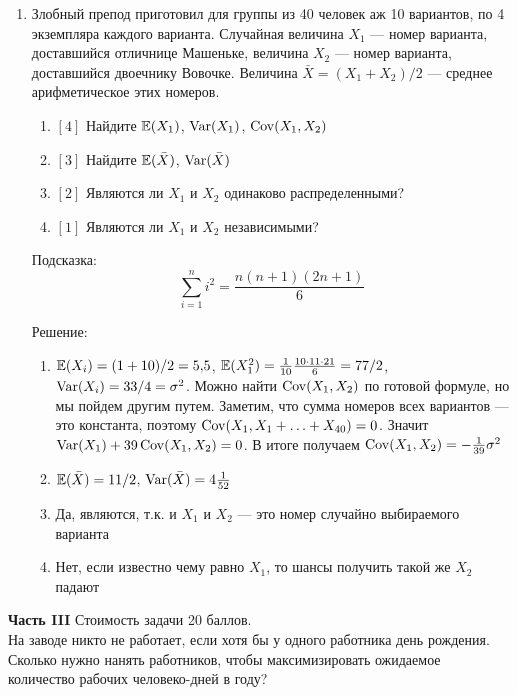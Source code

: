 \documentclass[12pt, a4paper]{article}\usepackage[]{graphicx}\usepackage[]{color}
\begin{document}
\begin{enumerate}
\item Злобный препод приготовил для группы из 40 человек аж 10 вариантов, по 4 экземпляра каждого варианта. Случайная величина $X_1$ — номер варианта, доставшийся отличнице Машеньке, величина $X_2$ — номер варианта, доставшийся двоечнику Вовочке. Величина $\bar{X}=(X_1+X_2)/2$ — среднее арифметическое этих номеров.
\begin{enumerate}
\item $[4]$ Найдите $\mathbb{E}(X_1)$, $\operatorname{Var}(X_1)$, $\operatorname{Cov}(X_1,X_2)$
\item $[3]$ Найдите $\mathbb{E}(\bar{X})$, $\operatorname{Var}(\bar{X})$
\item $[2]$ Являются ли $X_1$ и $X_2$ одинаково распределенными?
\item $[1]$ Являются ли $X_1$ и $X_2$ независимыми?
\end{enumerate}

Подсказка:
\begin{equation}
\sum_{i=1}^{n} i^2=\frac{n(n+1)(2n+1)}{6}
\end{equation}

Решение:
\begin{enumerate}
\item $\mathbb{E}(X_i)=(1+10)/2=5{,}5$, $\mathbb{E}(X_1^2)=\frac{1}{10}\frac{10\cdot 11\cdot 21}{6}=77/2$, $\operatorname{Var}(X_i)=33/4=\sigma^2$.
Можно найти $\operatorname{Cov}(X_1,X_2)$ по готовой формуле, но мы пойдем другим путем. Заметим, что сумма номеров всех вариантов — это константа, поэтому $\operatorname{Cov}(X_1,X_1+\ldots+X_{40})=0$. Значит $\operatorname{Var}(X_1)+39\operatorname{Cov}(X_1,X_2)=0$. В итоге получаем $\operatorname{Cov}(X_1,X_2)=-\frac{1}{39}\sigma^2$
\item $\mathbb{E}(\bar{X})=11/2$, $\operatorname{Var}(\bar{X})=4\frac{1}{52}$
\item Да, являются, т.к. и $X_1$ и $X_2$ — это номер случайно выбираемого варианта
\item Нет, если известно чему равно $X_1$, то шансы получить такой же $X_2$ падают
\end{enumerate}




\end{enumerate}

\textbf{Часть III} Стоимость задачи 20 баллов. \\ %


На заводе никто не работает, если хотя бы у одного работника день рождения. Сколько нужно нанять работников, чтобы максимизировать ожидаемое количество рабочих человеко-дней в году?
\end{document}
